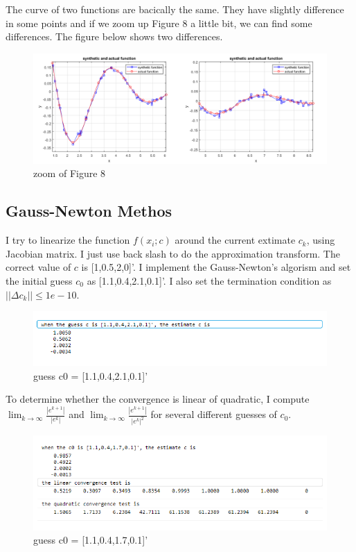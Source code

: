 \documentclass[a4paper]{article}
\begin{document}
The curve of two functions are bacically the same. They have slightly difference in some points and if we zoom up Figure 8 a little bit, we can find some differences. The figure below shows two differences.

\begin{figure}[H] 
\centering 
\includegraphics[width=1.0\textwidth]{2.1-4.png}
\caption{zoom of Figure 8} 
\label{Fig.2.1-4} 
\end{figure}

\subsection{Gauss-Newton Methos}
I try to linearize the function $f(x_{i};c)$ around the current extimate $c_{k}$, using Jacobian matrix. I just use back slash to do the approximation transform. The correct value of $c$ is [1,0.5,2,0]'. I implement the Gauss-Newton's algorism and set the initial guess $c_{0}$ as [1.1,0.4,2.1,0.1]'. I also set the termination condition as $||\Delta c_{k}|| \leq 1e-10$. 

\begin{figure}[H] 
\centering 
\includegraphics[width=1.0\textwidth]{2.2-1.png}
\caption{guess c0 = [1.1,0.4,2.1,0.1]'} 
\label{Fig.2.2-1} 
\end{figure}

To determine whether the convergence is linear of quadratic, I compute $\lim_{k \to \infty}\frac{|e^{k+1}|}{|e^{k}|}$ and $\lim_{k \to \infty}\frac{|e^{k+1}|}{|e^{k}|^{2}}$ for several different guesses of $c_{0}$.

\begin{figure}[H] 
\centering 
\includegraphics[width=1.0\textwidth]{2.2-2.png}
\caption{guess c0 = [1.1,0.4,1.7,0.1]'} 
\label{Fig.2.2-2} 
\end{figure}
\end{document}
